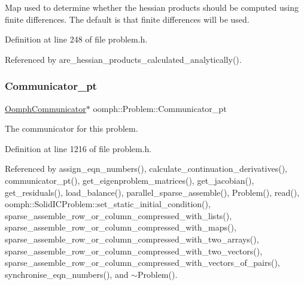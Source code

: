 Map used to determine whether the hessian products should be computed using finite differences. The default is that finite differences will be used. 



Definition at line 248 of file problem.\+h.



Referenced by are\+\_\+hessian\+\_\+products\+\_\+calculated\+\_\+analytically().

\mbox{\label{classoomph_1_1Problem_a937afdd0d5a039943482f8be9b24c82e}} 
\subsubsection{\texorpdfstring{Communicator\+\_\+pt}{Communicator\_pt}}
{\footnotesize\ttfamily \hyperlink{classoomph_1_1OomphCommunicator}{Oomph\+Communicator}$\ast$ oomph\+::\+Problem\+::\+Communicator\+\_\+pt\hspace{0.3cm}{\ttfamily [protected]}}



The communicator for this problem. 



Definition at line 1216 of file problem.\+h.



Referenced by assign\+\_\+eqn\+\_\+numbers(), calculate\+\_\+continuation\+\_\+derivatives(), communicator\+\_\+pt(), get\+\_\+eigenproblem\+\_\+matrices(), get\+\_\+jacobian(), get\+\_\+residuals(), load\+\_\+balance(), parallel\+\_\+sparse\+\_\+assemble(), Problem(), read(), oomph\+::\+Solid\+I\+C\+Problem\+::set\+\_\+static\+\_\+initial\+\_\+condition(), sparse\+\_\+assemble\+\_\+row\+\_\+or\+\_\+column\+\_\+compressed\+\_\+with\+\_\+lists(), sparse\+\_\+assemble\+\_\+row\+\_\+or\+\_\+column\+\_\+compressed\+\_\+with\+\_\+maps(), sparse\+\_\+assemble\+\_\+row\+\_\+or\+\_\+column\+\_\+compressed\+\_\+with\+\_\+two\+\_\+arrays(), sparse\+\_\+assemble\+\_\+row\+\_\+or\+\_\+column\+\_\+compressed\+\_\+with\+\_\+two\+\_\+vectors(), sparse\+\_\+assemble\+\_\+row\+\_\+or\+\_\+column\+\_\+compressed\+\_\+with\+\_\+vectors\+\_\+of\+\_\+pairs(), synchronise\+\_\+eqn\+\_\+numbers(), and $\sim$\+Problem().

\mbox{\label{classoomph_1_1Problem_a6904003416e9a9257db70c009bdc69ed}} 
